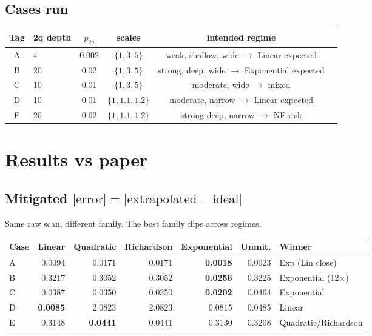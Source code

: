 \documentclass[11pt]{article}
\begin{document}
\subsection{Cases run}
\begin{center}
\begin{tabular}{@{}clcccl@{}}
\toprule
Tag & 2q depth & $p_{2q}$ & scales & intended regime \\
\midrule
A & 4  & 0.002 & $\{1,3,5\}$      & weak, shallow, wide $\to$ Linear expected \\
B & 20 & 0.02  & $\{1,3,5\}$      & strong, deep, wide $\to$ Exponential expected \\
C & 10 & 0.01  & $\{1,3,5\}$      & moderate, wide $\to$ mixed \\
D & 10 & 0.01  & $\{1,1.1,1.2\}$  & moderate, narrow $\to$ Linear expected \\
E & 20 & 0.02  & $\{1,1.1,1.2\}$  & strong deep, narrow $\to$ NF risk \\
\bottomrule
\end{tabular}
\end{center}

\section{Results vs paper}

\subsection{Mitigated $|\mathrm{error}| = |\text{extrapolated} - \text{ideal}|$}
Same raw scan, different family. The best family flips across regimes.

\begin{center}
\begin{tabular}{@{}lrrrrrl@{}}
\toprule
Case & Linear & Quadratic & Richardson & Exponential & Unmit. & Winner \\
\midrule
A & 0.0094 & 0.0171 & 0.0171 & \textbf{0.0018} & 0.0023 & Exp (Lin close) \\
B & 0.3217 & 0.3052 & 0.3052 & \textbf{0.0256} & 0.3225 & Exponential (12$\times$) \\
C & 0.0387 & 0.0350 & 0.0350 & \textbf{0.0202} & 0.0464 & Exponential \\
D & \textbf{0.0085} & 2.0823 & 2.0823 & 0.0815 & 0.0485 & Linear \\
E & 0.3148 & \textbf{0.0441} & 0.0441 & 0.3130 & 0.3208 & Quadratic/Richardson \\
\bottomrule
\end{tabular}
\end{center}
\end{document}
